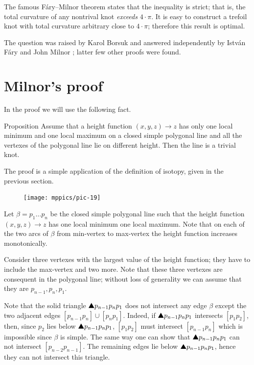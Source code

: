 The famous F\'ary--Milnor theorem states that the inequality is strict;
that is, the total curvature of any nontrival knot \emph{exceeds} $4\cdot\pi$.
It is easy to construct a trefoil knot with total curvature arbitrary close to $4\cdot\pi$;
therefore this result is optimal.

The question was raised by Karol Borsuk \cite{borsuk} and answered independently by Istv\'an F\'ary and John Milnor \cite{fary, milnor};
latter few other proofs were found.

\section{Milnor's proof}

In the proof we will use the following fact. 

\begin{thm}{Proposition}\label{prop:one-max-one-min}
Assume that a height function $(x,y,z)\to z$ 
has only one local minimum and one local maximum on a closed simple polygonal line and all the vertexes of the polygonal line lie on different height.
Then the line is a trivial knot.
\end{thm}

The proof is a simple application of the definition of isotopy, given in the previous section. 

\begin{figure}
\vskip-0mm
\centering
\texttt{[image: mppics/pic-19]}
\vskip0mm
\end{figure}

Let $\beta=p_1\dots p_n$ be the closed simple polygonal line
such that the height function $(x,y,z)\to z$ has one local minimum one local maximum.
Note that on each of the two arcs of $\beta$ from min-vertex to max-vertex the height function increases monotonically.

Consider three vertexes with the largest value of the height function;
they have to include the max-vertex and two more.
Note that these three vertexes are consequent in the polygonal line; 
without loss of generality we can assume that they are $p_{n-1},p_n,p_1$.

Note that the solid triangle $\solidtriangle p_{n-1}p_np_1$ does not intersect any edge $\beta$ except the two adjacent edges $[p_{n-1}p_n]\cup[p_np_1]$.
Indeed, if $\solidtriangle p_{n-1}p_np_1$ intersects $[p_1p_2]$,
then, 
since $p_2$ lies below $\solidtriangle p_{n-1}p_np_1$,
$[p_1p_2]$ must intersect $[p_{n-1}p_n]$
which is impossible since $\beta$ is simple.
The same way one can show that $\solidtriangle p_{n-1}p_np_1$ can not intersect $[p_{n-2}p_{n-1}]$.
The remaining edges lie below $\solidtriangle p_{n-1}p_np_1$, hence they can not intersect this triangle.

